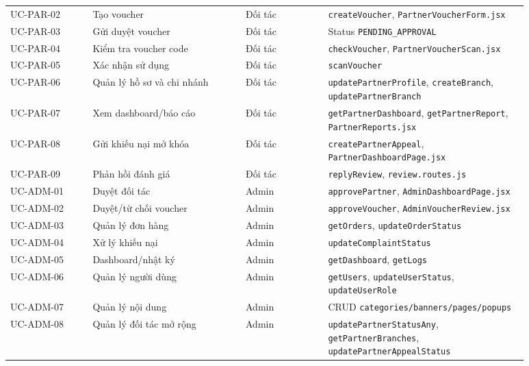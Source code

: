 \begin{longtable}{>{\raggedright\arraybackslash}p{0.14\linewidth}>{\raggedright\arraybackslash}p{0.26\linewidth}>{\raggedright\arraybackslash}p{0.14\linewidth}>{\raggedright\arraybackslash}p{0.34\linewidth}}
UC-PAR-02 & Tạo voucher & Đối tác & \texttt{createVoucher}, \texttt{PartnerVoucherForm.jsx}\\
UC-PAR-03 & Gửi duyệt voucher & Đối tác & Status \texttt{PENDING\_APPROVAL}\\
UC-PAR-04 & Kiểm tra voucher code & Đối tác & \texttt{checkVoucher}, \texttt{PartnerVoucherScan.jsx}\\
UC-PAR-05 & Xác nhận sử dụng & Đối tác & \texttt{scanVoucher}\\
UC-PAR-06 & Quản lý hồ sơ và chi nhánh & Đối tác & \texttt{updatePartnerProfile}, \texttt{createBranch}, \texttt{updatePartnerBranch}\\
UC-PAR-07 & Xem dashboard/báo cáo & Đối tác & \texttt{getPartnerDashboard}, \texttt{getPartnerReport}, \texttt{PartnerReports.jsx}\\
UC-PAR-08 & Gửi khiếu nại mở khóa & Đối tác & \texttt{createPartnerAppeal}, \texttt{PartnerDashboardPage.jsx}\\
UC-PAR-09 & Phản hồi đánh giá & Đối tác & \texttt{replyReview}, \texttt{review.routes.js}\\
UC-ADM-01 & Duyệt đối tác & Admin & \texttt{approvePartner}, \texttt{AdminDashboardPage.jsx}\\
UC-ADM-02 & Duyệt/từ chối voucher & Admin & \texttt{approveVoucher}, \texttt{AdminVoucherReview.jsx}\\
UC-ADM-03 & Quản lý đơn hàng & Admin & \texttt{getOrders}, \texttt{updateOrderStatus}\\
UC-ADM-04 & Xử lý khiếu nại & Admin & \texttt{updateComplaintStatus}\\
UC-ADM-05 & Dashboard/nhật ký & Admin & \texttt{getDashboard}, \texttt{getLogs}\\
UC-ADM-06 & Quản lý người dùng & Admin & \texttt{getUsers}, \texttt{updateUserStatus}, \texttt{updateUserRole}\\
UC-ADM-07 & Quản lý nội dung & Admin & CRUD \texttt{categories/banners/pages/popups}\\
UC-ADM-08 & Quản lý đối tác mở rộng & Admin & \texttt{updatePartnerStatusAny}, \texttt{getPartnerBranches}, \texttt{updatePartnerAppealStatus}\\
\bottomrule
\end{longtable}
\normalsize

\newcommand{\uctitle}[2]{\subsection{#1 --- #2}}


